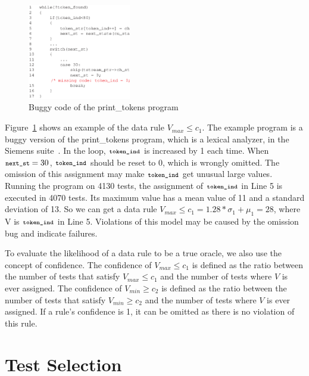 \documentclass{sig-alternate}
\newcommand{\CodeIn}[1]{{\small\texttt{#1}}}
\begin{document}
\begin{figure}[h]
  \includegraphics[angle=0,width=0.4\textwidth]{figs/example31.eps}
  \centering
  \caption{Buggy code of the print\_tokens program}
  \label{fig:example3}
\end{figure}

Figure~\ref{fig:example3} shows an example of the data rule
$V_{max}\le c_1$. The example program is a buggy version of the
print\_tokens program, which is a lexical analyzer, in the Siemens
suite~\cite{Hutchins94}. In the loop, $\CodeIn{token\_ind}$ is
increased by 1 each time. When $\CodeIn{next\_st}=30$,
$\CodeIn{token\_ind}$ should be reset to 0, which is wrongly
omitted. The omission of this assignment may make
$\CodeIn{token\_ind}$ get unusual large values. Running the program
on 4130 tests, the assignment of $\CodeIn{token\_ind}$ in Line 5 is
executed in 4070 tests. Its maximum value has a mean value of 11 and
a standard deviation of 13. So we can get a data rule $V_{max}\le
c_1=1.28*\sigma_1+\mu_1=28$, where V is $\CodeIn{token\_ind}$ in
Line 5. Violations of this model may be caused by the omission bug
and indicate failures.



To evaluate the likelihood of a data rule to be a true oracle, we
also use the concept of confidence. The confidence of $V_{max}\le
c_1$ is defined as the ratio between the number of tests that
satisfy $V_{max}\le c_1$ and the number of tests where $V$ is ever
assigned. The confidence of $V_{min}\ge c_2$ is defined as the ratio
between the number of tests that satisfy $V_{min}\ge c_2$ and the
number of tests where $V$ is ever assigned. If a rule's confidence
is 1, it can be omitted as there is no violation of this rule.




\section{Test Selection} \label{sec:select}
\end{document}
